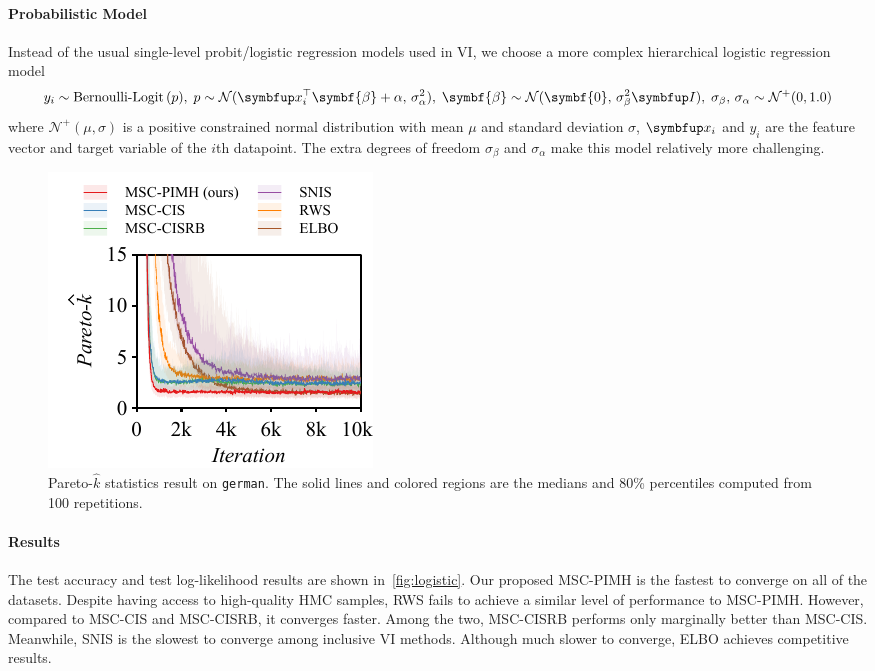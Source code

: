 \vspace{-0.1in}
\paragraph{Probabilistic Model}
Instead of the usual single-level probit/logistic regression models used in VI, we choose a more complex hierarchical logistic regression model 
%
\begin{equation}
y_i \sim \text{Bernoulli-Logit}\,(p),\;
p \sim \mathcal{N}(\vx_i^{\top}\symbf{\beta} + \alpha,\, \sigma_{\alpha}^2),\;
\symbf{\beta} \sim \mathcal{N}(\symbf{0},\, \sigma_{\beta}^2 \mI),\;
\sigma_{\beta},\,\sigma_{\alpha} \sim \mathcal{N}^{+}(0, 1.0)
\end{equation}
%
where \(\mathcal{N}^+(\mu, \sigma)\) is a positive constrained normal distribution with mean \(\mu\) and standard deviation \(\sigma\), \(\vx_i\) and \(y_i\) are the feature vector and target variable of the \(i\)th datapoint.
The extra degrees of freedom \(\sigma_{\beta}\) and \(\sigma_{\alpha}\) make this model relatively more challenging.

%
\begin{figure}
  \vspace{-0.3in}
  \includegraphics[scale=0.75]{figures/german_01.pdf}
  \caption{Pareto-\(\widehat{k}\) statistics result on \texttt{german}.
    The solid lines and colored regions are the medians and 80\% percentiles computed from 100 repetitions.
    }\label{fig:paretok}
  \vspace{-0.2in}
\end{figure}
%
\vspace{-0.1in}
\paragraph{Results}
The test accuracy and test log-likelihood results are shown in~\cref{fig:logistic}.
Our proposed MSC-PIMH is the fastest to converge on all of the datasets.
Despite having access to high-quality HMC samples, RWS fails to achieve a similar level of performance to MSC-PIMH.
However, compared to MSC-CIS and MSC-CISRB, it converges faster.
Among the two, MSC-CISRB performs only marginally better than MSC-CIS.
Meanwhile, SNIS is the slowest to converge among inclusive VI methods.
Although much slower to converge, ELBO achieves competitive results.

